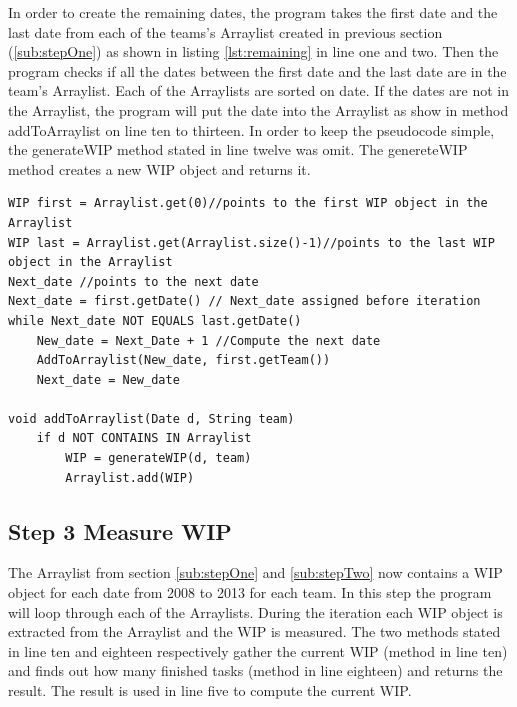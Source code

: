 \documentclass[UKenglish]{ifimaster}  %
\begin{document}
In order to create the remaining dates, the program takes the first date and the last date from each of the teams's Arraylist created in previous section (\ref{sub:stepOne}) as shown in listing \ref{lst:remaining} in line one and two. Then the program checks if all the dates between the first date and the last date are in the team's Arraylist. Each of the Arraylists are sorted on date. If the dates are not in the Arraylist, the program will put the date into the Arraylist as show in method addToArraylist on line ten to thirteen.
In order to keep the pseudocode simple, the generateWIP method stated in line twelve was omit. The genereteWIP method creates a new WIP object and returns it. 

\begin{minipage}{\textwidth} 
\begin{lstlisting}[caption={Gather the remaining dates.},label={lst:remaining}]
WIP first = Arraylist.get(0)//points to the first WIP object in the Arraylist 
WIP last = Arraylist.get(Arraylist.size()-1)//points to the last WIP object in the Arraylist 
Next_date //points to the next date
Next_date = first.getDate() // Next_date assigned before iteration
while Next_date NOT EQUALS last.getDate()
	New_date = Next_Date + 1 //Compute the next date
	AddToArraylist(New_date, first.getTeam())
	Next_date = New_date

void addToArraylist(Date d, String team)
	if d NOT CONTAINS IN Arraylist
		WIP = generateWIP(d, team)
		Arraylist.add(WIP) 
 \end{lstlisting}
   \end{minipage}

\subsection{Step 3 Measure WIP}
The Arraylist from section \ref{sub:stepOne}  and \ref{sub:stepTwo} now contains a WIP object for each date from 2008 to 2013 for each team. In this step the program will loop through each of the Arraylists. During the iteration each WIP object is extracted from the Arraylist and the WIP is measured. The two methods stated in line ten and eighteen respectively gather the current WIP (method in line ten) and finds out how many finished tasks (method in line eighteen) and returns the result. The result is used in line five to compute the current WIP. 
\end{document}
